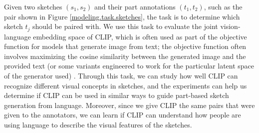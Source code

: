 Given two sketches $(s_1,s_2)$ and their part annotations $(t_1,t_2)$, such as the pair shown in Figure \ref{modeling.task.sketches}, the task is to determine which sketch $t_j$ should be paired with.
We use this task to evaluate the joint vision-language embedding space of CLIP, which is often used as part of the objective function for models that generate image from text; the objective function often involves maximizing the cosine similarity between the generated image and the provided text (or some variants engineered to work for the particular latent space of the generator used) \citep{clipDrawPaper,styleCLIPPaper,styleganNadaPaper,dalle2Paper}. 
Through this task, we can study how well CLIP can recognize different visual concepts in sketches, and the experiments can help us determine if CLIP can be used in similar ways to guide part-based sketch generation from language. Moreover, since we give CLIP the same pairs that were given to the annotators, we can learn if CLIP can understand how people are using language to describe the visual features of the sketches.   

